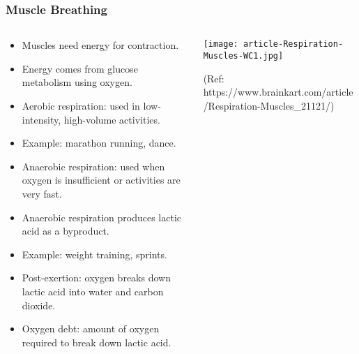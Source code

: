 \begin{frame}[fragile]\frametitle{Muscle Breathing}
\begin{columns}
    \begin{column}[T]{0.7\linewidth}
      \begin{itemize}
		\item Muscles need energy for contraction.
		\item Energy comes from glucose metabolism using oxygen.
		\item Aerobic respiration: used in low-intensity, high-volume activities.
		\item Example: marathon running, dance.
		\item Anaerobic respiration: used when oxygen is insufficient or activities are very fast.
		\item Anaerobic respiration produces lactic acid as a byproduct.
		\item Example: weight training, sprints.
		\item Post-exertion: oxygen breaks down lactic acid into water and carbon dioxide.
		\item Oxygen debt: amount of oxygen required to break down lactic acid.
	  \end{itemize}
    \end{column}
    \begin{column}[T]{0.3\linewidth}
		\begin{center}
		\texttt{[image: article-Respiration-Muscles-WC1.jpg]}
				
		{\tiny (Ref: https://www.brainkart.com/article/Respiration-Muscles\_21121/)}
		\end{center}	
    \end{column}
  \end{columns}
\end{frame}

